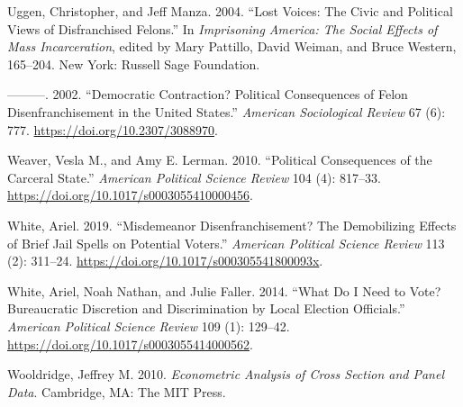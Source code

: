 \documentclass[
  12pt,
]{article}
\newlength{\cslhangindent}
\newenvironment{cslreferences}%
  {\setlength{\parindent}{0pt}%
  \everypar{\setlength{\hangindent}{\cslhangindent}}\ignorespaces}%
  {\par}
\begin{document}
\begin{cslreferences}
\leavevmode\hypertarget{ref-Uggen2004}{}%
Uggen, Christopher, and Jeff Manza. 2004. ``Lost Voices: The Civic and Political Views of Disfranchised Felons.'' In \emph{Imprisoning America: The Social Effects of Mass Incarceration}, edited by Mary Pattillo, David Weiman, and Bruce Western, 165--204. New York: Russell Sage Foundation.

\leavevmode\hypertarget{ref-Uggen2002}{}%
---------. 2002. ``Democratic Contraction? Political Consequences of Felon Disenfranchisement in the United States.'' \emph{American Sociological Review} 67 (6): 777. \url{https://doi.org/10.2307/3088970}.

\leavevmode\hypertarget{ref-Weaver2010}{}%
Weaver, Vesla M., and Amy E. Lerman. 2010. ``Political Consequences of the Carceral State.'' \emph{American Political Science Review} 104 (4): 817--33. \url{https://doi.org/10.1017/s0003055410000456}.

\leavevmode\hypertarget{ref-White2019}{}%
White, Ariel. 2019. ``Misdemeanor Disenfranchisement? The Demobilizing Effects of Brief Jail Spells on Potential Voters.'' \emph{American Political Science Review} 113 (2): 311--24. \url{https://doi.org/10.1017/s000305541800093x}.

\leavevmode\hypertarget{ref-WHITE2014}{}%
White, Ariel, Noah Nathan, and Julie Faller. 2014. ``What Do I Need to Vote? Bureaucratic Discretion and Discrimination by Local Election Officials.'' \emph{American Political Science Review} 109 (1): 129--42. \url{https://doi.org/10.1017/s0003055414000562}.

\leavevmode\hypertarget{ref-Wooldridge2010}{}%
Wooldridge, Jeffrey M. 2010. \emph{Econometric Analysis of Cross Section and Panel Data}. Cambridge, MA: The MIT Press.
\end{cslreferences}
\end{document}
